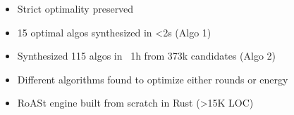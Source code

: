 \begin{frame}{}

\vspace{0.4cm}

\begin{itemize}\setlength\itemsep{0.6cm}
    \item<1-> Strict optimality preserved
    \item<2-> 15 optimal algos synthesized in <2s (Algo 1)
    \item<3-> Synthesized 115 algos in ~1h from 373k candidates (Algo 2)
    \item<4-> Different algorithms found to optimize either rounds or energy
    \item<5-> RoASt engine built from scratch in Rust (>15K LOC)
\end{itemize}

\end{frame}
